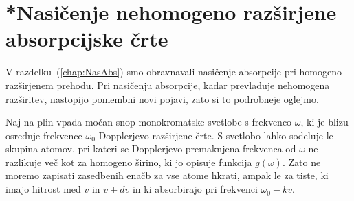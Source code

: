 \section{*Nasičenje nehomogeno razširjene absorpcijske črte}

V razdelku~(\ref{chap:NasAbs}) smo obravnavali nasičenje absorpcije pri homogeno 
razširjenem prehodu. Pri nasičenju absorpcije, kadar prevladuje nehomogena razširitev,
nastopijo pomembni novi pojavi, zato si to podrobneje oglejmo.


Naj na plin vpada močan snop monokromatske svetlobe s frekvenco $\omega$,
ki je blizu osrednje frekvence $\omega_{0}$ Dopplerjevo razširjene črte. S svetlobo
lahko sodeluje le skupina atomov, pri kateri se Dopplerjevo premaknjena
frekvenca od $\omega$ ne razlikuje več kot za homogeno širino, ki
jo opisuje funkcija $g(\omega)$. Zato ne moremo zapisati zasedbenih
enačb za vse atome hkrati, ampak le za tiste, ki imajo hitrost med
$v$ in $v+dv$ in ki absorbirajo pri frekvenci $\omega_{0}-kv$.


